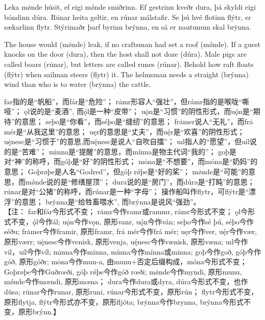 \begin{paracol}{2}
    \switchcolumn*
    Leka mø̇nde húsit, ef eigi mǿnde smiðrinn. Ef gestrinn kveðr dura, þá skyldi eigi bóndinn dúra. Ru̇nar heita geltir, en rúnar málstafir. Se þú hvé flotinn flýtr, er sækarlinn flytr. Stýrimaðr þarf byrinn brýnna, en sá er nautunum skal brẏnna.

    \switchcolumn
    The house would (mø̇nde) leak, if no craftsman had set a roof (mǿnde). If a guest knocks on the door (dura), then the host shall not doze (dúra). Male pigs are called boars (ru̇nar), but letters are called runes (rúnar). Behold how raft floats (flýtr) when sailman steers (flytr) it. The helmsman needs a straight (brýnna) wind than who is to water (brẏnna) the cattle.
\end{paracol}
\begin{translation*}{}
    far指的是“帆船”，而fár是“危险”；
    r\.{a}mr形容人“强壮”，但rámr指的是喉咙“嘶哑”；
    ǫl说的是“麦酒”, 而ǫ́l是一种“皮带”；
    u\.{ǫ}n是“习惯”的阴性形式，而uǫ́n是“期待”的意思；
    seþo是“你看”，而séþo是“缝纫”的意思；
    fr\.{a}mer说人“无礼”，而frȧ mér是“从我这里”的意思；
    uęr的意思是“丈夫”，而uę́r是“欢喜”的阴性形式；
    u\.{ę}nesc是“习惯于”的意思,而uę́nesc是说人“自吹自擂”；
    uıl指人的“愿望”，但uíl说的是“苦难”；
    m\.{ı}nna是“提醒”的意思，而mínna是物主代词“我的”；
    goþ是对“神”的称呼，而góþ是“好”的阴性形式；
    mȯna是“不想要”，而móna是“奶妈”的意思；
    Goþrøþe是人名“Godred”，但góþ rǿþe是“好的桨”；
    m\.{ø}nde是“可能”的意思，而mǿnde说的是“修缮屋顶”；
    dura说的是“房门”，而dúra是“打盹”的意思；
    r\.{u}nar是对“公猪”的称呼，而rúnar是一种“字母”；
    操作船叫作flytr，可flýtr是“漂浮”的意思；
    br\.{y}nna是“给牲畜喂水”, 而brýnna是说风“强劲”。\\

    【注：
    far和fár今形式不变；
    r\.{a}mr今作ramr或rammr, rámr今形式不变；
    ǫl今形式不变，ǫ́l今作ál;
    u\.{ǫ}n今作vǫn, 原形vanr, u\'{ǫ}n今作ván; seþo今作sé þú, séþo今作séðu;
    fr\.{a}mer今作framir, 原形framr, frȧ mér今作frá mér;
    uęr今作ver, u\'{ę}r今作vær, 原形værr;
    u\.{ę}nesc今作venisk, 原形venja, u\'{ę}nesc今作vænisk, 原形væna;
    uıl今作vil，uíl今作víl;
    m\.{ı}nna今作minna, mínna今作mínna或minna;
    goþ今作goð, góþ今作góð, 原形góðr;
    mȯna今作mun-a, 由munu+否定后缀构成，móna今形式不变；
    Goþrøþe今作Guðrœði, góþ rǿþe今作góð rœði;
    m\.{ø}nde今作myndi, 原形munu, mǿnde今作mœndi, 原形mœna；
    dura今作dura或dyra, dúra今形式不变，也作dúsa;
    r\.{u}nar今作runar, 原形runi, rúnar今形式不变，原形rún；
    flytr今形式不变，原形flytja, flýtr今形式亦不变，原形fljóta;
    br\.{y}nna今作brynna, brýnna今形式不变，原形brýnn.】
\end{translation*}

